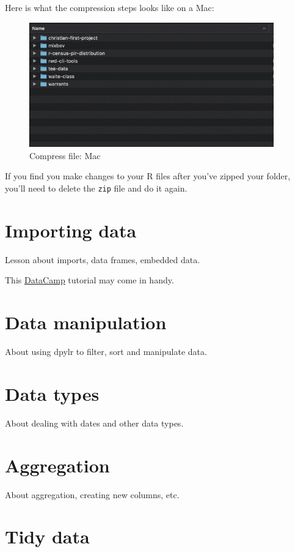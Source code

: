 \documentclass[]{book}
\begin{document}
Here is what the compression steps looks like on a Mac:

\begin{figure}
\centering
\includegraphics[width=4.16667in]{images/intro-compress.gif}
\caption{Compress file: Mac}
\end{figure}

If you find you make changes to your R files after you've zipped your
folder, you'll need to delete the \texttt{zip} file and do it again.

\chapter{Importing data}\label{import}

Lesson about imports, data frames, embedded data.

This
\href{https://www.datacamp.com/community/tutorials/r-data-import-tutorial\#spss}{DataCamp}
tutorial may come in handy.

\chapter{Data manipulation}\label{manipulation}

About using dpylr to filter, sort and manipulate data.

\chapter{Data types}\label{datatypes}

About dealing with dates and other data types.

\chapter{Aggregation}\label{aggregation}

About aggregation, creating new columns, etc.

\chapter{Tidy data}\label{tidy}
\end{document}
